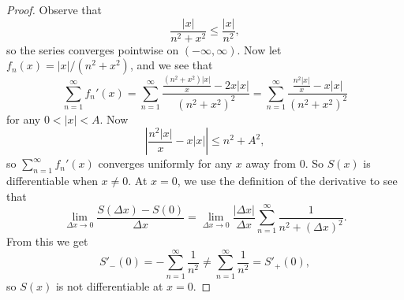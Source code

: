 \begin{proof}
  Observe that
  \[
    \frac{|x|}{n^2 + x^2} \le \frac{|x|}{n^2},
  \]
  so the series converges pointwise on
  $(-\infty, \infty)$. Now let $f_n(x) = |x| / (n^2 + x^2)$,
  and we see that
  \[
    \sum_{n = 1}^\infty f_n'(x)
    = \sum_{n = 1}^\infty \frac{\frac{(n^2 + x^2)|x|}{x} - 2x |x|}{(n^2 + x^2)^2}
    = \sum_{n = 1}^\infty \frac{\frac{n^2|x|}{x} - x |x|}{(n^2 + x^2)^2}
  \]
  for any $0 < |x| < A$.
  Now
  \[
    \left| \frac{n^2 |x|}{x} - x |x| \right|
    \le n^2 + A^2,
  \]
  so $\sum_{n = 1}^\infty f_n'(x)$ converges uniformly
  for any $x$ away from $0$. So $S(x)$ is differentiable
  when $x \ne 0$.
  At $x = 0$, we use the definition of the derivative
  to see that
  \[
    \lim_{\Delta x \to 0} \frac{S(\Delta x) - S(0)}{\Delta x}
    = \lim_{\Delta x \to 0} \frac{|\Delta x|}{\Delta x} \sum_{n = 1}^\infty \frac{1}{n^2 + (\Delta x)^2}.
  \]
  From this we get
  \[
    S'_-(0) = -\sum_{n = 1}^\infty \frac{1}{n^2}
    \ne \sum_{n = 1}^\infty \frac{1}{n^2}
    = S'_+(0),
  \]
  so $S(x)$ is not differentiable at $x = 0$.
\end{proof}
